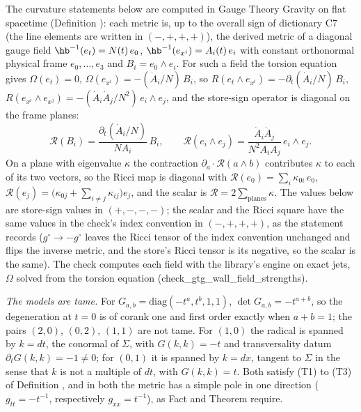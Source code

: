 The curvature statements below are computed in Gauge Theory Gravity on flat spacetime (Definition ): each metric is, up to the overall sign of dictionary C7 (the line elements are written in $(-,+,+,+)$), the derived metric of a diagonal gauge field $\hb^{-1}(e_{t}) = N(t)\,e_{0}$, $\hb^{-1}(e_{x^{i}}) = A_{i}(t)\,e_{i}$ with constant orthonormal physical frame $e_{0}, \dots, e_{3}$ and $B_{i} = e_{0}\wedge e_{i}$. For such a field the torsion equation gives $\Omega(e_{t}) = 0$, $\Omega(e_{x^{i}}) = -(\dot A_{i}/N)\,B_{i}$, so $R(e_{t}\wedge e_{x^{i}}) = -\partial_{t}(\dot A_{i}/N)\,B_{i}$, $R(e_{x^{i}}\wedge e_{x^{j}}) = -(\dot A_{i}\dot A_{j}/N^{2})\,e_{i}\wedge e_{j}$, and the store-sign operator is diagonal on the frame planes:
\[
\mathcal{R}(B_{i}) = \frac{\partial_{t}(\dot A_{i}/N)}{N A_{i}}\,B_{i}, \qquad \mathcal{R}(e_{i}\wedge e_{j}) = \frac{\dot A_{i}\dot A_{j}}{N^{2}A_{i}A_{j}}\,e_{i}\wedge e_{j}.
\]
On a plane with eigenvalue $\kappa$ the contraction $\partial_{a}\cdot\mathcal{R}(a\wedge b)$ contributes $\kappa$ to each of its two vectors, so the Ricci map is diagonal with $\mathcal{R}(e_{0}) = \sum_{i}\kappa_{0i}\,e_{0}$, $\mathcal{R}(e_{j}) = \bigl(\kappa_{0j} + \sum_{i \neq j}\kappa_{ij}\bigr)e_{j}$, and the scalar is $\mathcal{R} = 2\sum_{\text{planes}}\kappa$. The values below are store-sign values in $(+,-,-,-)$; the scalar and the Ricci square have the same values in the check's index convention in $(-,+,+,+)$, as the statement records ($g^{\circ} \to -g^{\circ}$ leaves the Ricci tensor of the index convention unchanged and flips the inverse metric, and the store's Ricci tensor is its negative, so the scalar is the same). The check computes each field with the library's engine on exact jets, $\Omega$ solved from the torsion equation (check\_gtg\_wall\_field\_strengths).

\emph{The models are tame.} For $G_{a,b} = \mathrm{diag}(-t^{a}, t^{b}, 1, 1)$, $\det G_{a,b} = -t^{a + b}$, so the degeneration at $t = 0$ is of corank one and first order exactly when $a + b = 1$; the pairs $(2, 0)$, $(0, 2)$, $(1, 1)$ are not tame. For $(1, 0)$ the radical is spanned by $k = dt$, the conormal of $\Sigma$, with $G(k, k) = -t$ and transversality datum $\partial_{t}G(k, k) = -1 \neq 0$; for $(0, 1)$ it is spanned by $k = dx$, tangent to $\Sigma$ in the sense that $k$ is not a multiple of $dt$, with $G(k, k) = t$. Both satisfy (T1) to (T3) of Definition , and in both the metric has a simple pole in one direction ($g_{tt} = -t^{-1}$, respectively $g_{xx} = t^{-1}$), as Fact  and Theorem  require.

